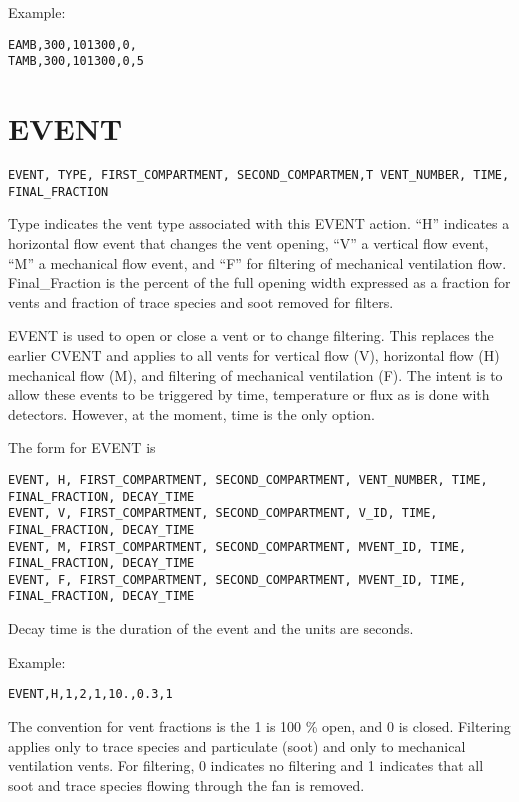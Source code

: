 Example:

\begin{lstlisting}
EAMB,300,101300,0,
TAMB,300,101300,0,5
\end{lstlisting}

\section{EVENT}

\begin{lstlisting}
EVENT, TYPE, FIRST_COMPARTMENT, SECOND_COMPARTMEN,T VENT_NUMBER, TIME, FINAL_FRACTION
\end{lstlisting}

Type indicates the vent type associated with this EVENT action. ``H'' indicates a horizontal flow event that changes the vent opening, ``V'' a vertical flow event, ``M'' a mechanical flow event, and ``F'' for filtering of mechanical ventilation flow.  Final\_Fraction is the percent of the full opening width expressed as a fraction for vents and fraction of trace species and soot removed for filters.

EVENT is used to open or close a vent or to change filtering. This replaces the earlier CVENT and applies to all vents for vertical flow (V), horizontal flow (H) mechanical flow (M), and filtering of mechanical ventilation (F). The intent is to allow these events to be triggered by time, temperature or flux as is done with detectors. However, at the moment, time is the only option.

The form for EVENT is

\begin{lstlisting}
EVENT, H, FIRST_COMPARTMENT, SECOND_COMPARTMENT, VENT_NUMBER, TIME, FINAL_FRACTION, DECAY_TIME
EVENT, V, FIRST_COMPARTMENT, SECOND_COMPARTMENT, V_ID, TIME, FINAL_FRACTION, DECAY_TIME
EVENT, M, FIRST_COMPARTMENT, SECOND_COMPARTMENT, MVENT_ID, TIME, FINAL_FRACTION, DECAY_TIME
EVENT, F, FIRST_COMPARTMENT, SECOND_COMPARTMENT, MVENT_ID, TIME, FINAL_FRACTION, DECAY_TIME   
\end{lstlisting}

Decay time is the duration of the event and the units are seconds.

Example:

\begin{lstlisting}
EVENT,H,1,2,1,10.,0.3,1
\end{lstlisting}

The convention for vent fractions is the 1 is 100 \% open, and 0 is closed. Filtering applies only to trace species and particulate (soot) and only to mechanical ventilation vents. For filtering, 0 indicates no filtering and 1 indicates that all soot and trace species flowing through the fan is removed. 


